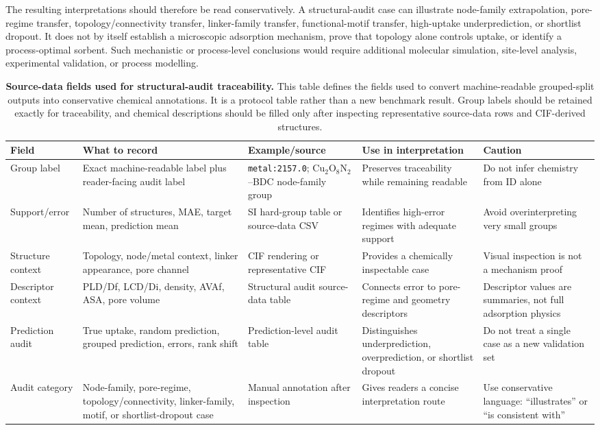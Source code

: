 \documentclass[11pt,a4paper]{article}
\begin{document}
The resulting interpretations should therefore be read conservatively. A structural-audit case can illustrate node-family extrapolation, pore-regime transfer, topology/connectivity transfer, linker-family transfer, functional-motif transfer, high-uptake underprediction, or shortlist dropout. It does not by itself establish a microscopic adsorption mechanism, prove that topology alone controls uptake, or identify a process-optimal sorbent. Such mechanistic or process-level conclusions would require additional molecular simulation, site-level analysis, experimental validation, or process modelling.




\begin{table}[H]
\centering
\small
\setlength{\tabcolsep}{3pt}
\caption{\textbf{Source-data fields used for structural-audit traceability.}
This table defines the fields used to convert machine-readable grouped-split outputs into conservative chemical annotations. It is a protocol table rather than a new benchmark result. Group labels should be retained exactly for traceability, and chemical descriptions should be filled only after inspecting representative source-data rows and CIF-derived structures.}
\begin{tabular}{p{} p{} p{} p{} p{}}
\toprule
\textbf{Field} & \textbf{What to record} & \textbf{Example/source} & \textbf{Use in interpretation} & \textbf{Caution} \\
\midrule
Group label & Exact machine-readable label plus reader-facing audit label & \texttt{metal:2157.0}; Cu$_2$O$_8$N$_2$--BDC node-family group & Preserves traceability while remaining readable & Do not infer chemistry from ID alone \\
Support/error & Number of structures, MAE, target mean, prediction mean & SI hard-group table or source-data CSV & Identifies high-error regimes with adequate support & Avoid overinterpreting very small groups \\
Structure context & Topology, node/metal context, linker appearance, pore channel & CIF rendering or representative CIF & Provides a chemically inspectable case & Visual inspection is not a mechanism proof \\
Descriptor context & PLD/Df, LCD/Di, density, AVAf, ASA, pore volume & Structural audit source-data table & Connects error to pore-regime and geometry descriptors & Descriptor values are summaries, not full adsorption physics \\
Prediction audit & True uptake, random prediction, grouped prediction, errors, rank shift & Prediction-level audit table & Distinguishes underprediction, overprediction, or shortlist dropout & Do not treat a single case as a new validation set \\
Audit category & Node-family, pore-regime, topology/connectivity, linker-family, motif, or shortlist-dropout case & Manual annotation after inspection & Gives readers a concise interpretation route & Use conservative language: ``illustrates'' or ``is consistent with'' \\
\bottomrule
\end{tabular}
\label{tab:manual_audit_worksheet}
\end{table}
\end{document}
